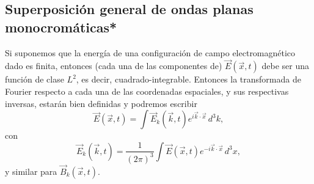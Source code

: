\subsection{Superposición general de ondas planas monocromáticas*}
Si suponemos que la energía de una configuración de campo electromagnético dado es finita, entonces (cada una de las componentes de) $\vec{E}(\vec{x},t)$ debe ser una función de clase $L^2$, es decir, cuadrado-integrable. Entonces la transformada de Fourier respecto a cada una de las coordenadas espaciales, y sus respectivas inversas, estarán bien definidas y podremos escribir
\begin{equation}
\vec{E}(\vec{x},t)=\int\vec{E}_k(\vec{k},t)e^{i\vec{k}\cdot\vec{x}}\,d^3k,
\end{equation}
con
\begin{equation}
\vec{E}_k(\vec{k},t)=\frac{1}{(2\pi)^3}\int\vec{E}(\vec{x},t)e^{-i\vec{k}\cdot\vec{x}}\,d^3x,
\end{equation}
y similar para $\vec{B}_k(\vec{x},t)$.

